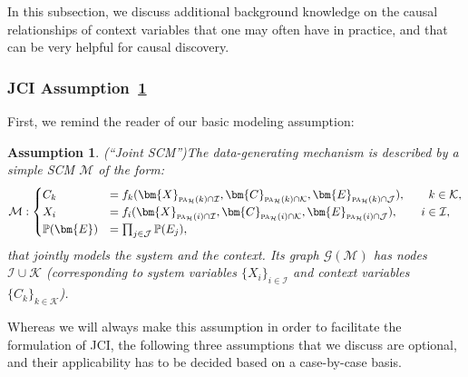 \documentclass[twoside,11pt]{article}
\newcommand{\Prb}{\mathbb{P}}
\newcommand\B[1]{\bm{#1}}
\newcommand\C[1]{\mathcal{#1}}
\newcommand\mathbfsc[1]{\text{\normalfont\scshape#1}}
\newcommand\pasub[2]{\mathbfsc{pa}_{#1}(#2)}
\newtheorem{assumption}{Assumption}
\begin{document}
In this subsection, we discuss additional background knowledge on the causal relationships
of context variables that one may often have in practice, and that can be very helpful for
causal discovery.

\subsubsection{JCI Assumption~\ref{ass:simple_scm}}

First, we remind the reader of our basic modeling assumption:
\setcounter{assumption}{-1}
\begin{assumption}(``Joint SCM'')\label{ass:simple_scm}
The data-generating mechanism is described by a simple SCM $\C{M}$ of the form:
\begin{equation}\label{eq:SCM_JCI_ass}
  \C{M}:
  \begin{cases}
    C_k &= f_k(\B{X}_{\pasub{\C{H}}{k} \cap \C{I}}, \B{C}_{\pasub{\C{H}}{k} \cap \C{K}}, \B{E}_{\pasub{\C{H}}{k} \cap \C{J}}), \qquad k \in \C{K}, \\
    X_i &= f_i(\B{X}_{\pasub{\C{H}}{i} \cap \C{I}}, \B{C}_{\pasub{\C{H}}{i} \cap \C{K}}, \B{E}_{\pasub{\C{H}}{i} \cap \C{J}}), \qquad i \in \C{I},\\
    \Prb(\B{E}) & = \prod_{j\in\C{J}} \Prb(E_j),
  \end{cases}
\end{equation}
that jointly models the system and the context.
Its graph $\C{G}(\C{M})$ has nodes
$\C{I} \cup \C{K}$ (corresponding to system variables $\{X_i\}_{i\in\C{I}}$ and context variables $\{C_k\}_{k\in\C{K}}$).
\end{assumption}
Whereas we will always make this assumption in order to facilitate the formulation of JCI, 
the following three assumptions that we discuss are optional,
and their applicability has to be decided based on a case-by-case basis.
\end{document}
